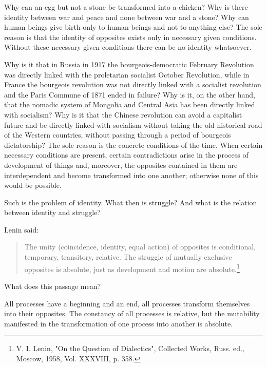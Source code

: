 \documentclass{article}
\begin{document}
Why can an egg but not a stone be transformed into a chicken? Why is there
identity between war and peace and none between war and a stone? Why can human
beings give birth only to human beings and not to anything else? The sole
reason is that the identity of opposites exists only in necessary given
conditions. Without these necessary given conditions there can be no identity
whatsoever.

Why is it that in Russia in 1917 the bourgeois-democratic February Revolution
was directly linked with the proletarian socialist October Revolution, while in
France the bourgeois revolution was not directly linked with a socialist
revolution and the Paris Commune of 1871 ended in failure? Why is it, on the
other hand, that the nomadic system of Mongolia and Central Asia has been
directly linked with socialism? Why is it that the Chinese revolution can avoid
a capitalist future and be directly linked with socialism without taking the
old historical road of the Western countries, without passing through a period
of bourgeois dictatorship? The sole reason is the concrete conditions of the
time. When certain necessary conditions are present, certain contradictions
arise in the process of development of things and, moreover, the opposites
contained in them are interdependent and become transformed into one another;
otherwise none of this would be possible.

Such is the problem of identity. What then is struggle? And what is the
relation between identity and struggle?

Lenin said:

\begin{quote}

The unity (coincidence, identity, equal action) of opposites is conditional,
temporary, transitory, relative. The struggle of mutually exclusive opposites
is absolute, just as development and motion are absolute.\footnote{V. I. Lenin,
"On the Question of Dialectics", Collected Works, Russ. ed., Moscow, 1958, Vol.
XXXVIII, p. 358.} \end{quote}

What does this passage mean?

All processes have a beginning and an end, all processes transform themselves
into their opposites. The constancy of all processes is relative, but the
mutability manifested in the transformation of one process into another is
absolute.
\end{document}
